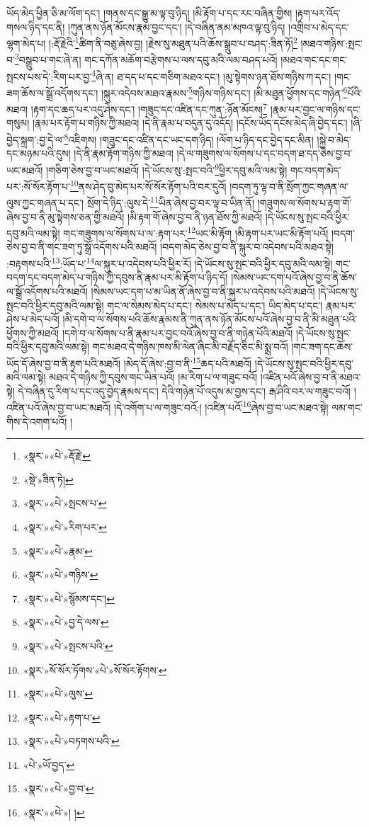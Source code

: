 ཡོད་མེད་ཕྱིན་ཅི་མ་ལོག་དང་། །གནས་དང་སྒྱུ་མ་ལྟ་བུ་ཉིད། །མི་རྟོག་པ་དང་རང་བཞིན་གྱིས། །རྟག་པར་འོད་གསལ་ཉིད་དང་ནི། །ཀུན་ནས་ཉོན་མོངས་རྣམ་བྱང་དང་། །དེ་བཞིན་ནམ་མཁའ་ལྟ་བུ་ཉིད། །འགྲིབ་པ་མེད་དང་ལྷག་མེད་པ། །:རྡོ་རྗེའི་\footnote{«སྣར་»«པེ་»རྡོ་རྗེ་}ཚིག་ནི་བཅུ་ཞེས་བྱ། །རྗེས་སུ་མཐུན་པའི་ཆོས་སྒྲུབ་པ་བཤད་:ཟིན་ཏོ།\footnote{«སྡེ་»ཟིན་ཏེ།} །མཐའ་གཉིས་:སྤང་བ་\footnote{«སྣར་»«པེ་»སྤངས་པ་}བསྒྲུབ་པ་གང་ཞེ་ན། གང་དཀོན་མཆོག་བརྩེགས་པ་ལས་དབུ་མའི་ལམ་བཤད་པའོ། །མཐའ་གང་དང་གང་སྤངས་པས་དེ་:རིག་པར་བྱ་\footnote{«སྣར་»«པེ་»རིག་པར་}ཞེ་ན། ཐ་དད་པ་དང་གཅིག་མཐའ་དང་། །མུ་སྟེགས་ཉན་ཐོས་གཉིས་ཀ་དང་། །གང་ཟག་ཆོས་ལ་སྒྲོ་འདོགས་དང་། །སྐུར་འདེབས་མཐའ་རྣམས་\footnote{«སྣར་»«པེ་»རྣམ་}གཉིས་གཉིས་དང་། །མི་མཐུན་ཕྱོགས་དང་གཉེན་\footnote{«སྣར་»«པེ་»གཉིས་}པོའི་མཐའ། །རྟག་དང་ཆད་པར་འདུ་ཤེས་དང་། །གཟུང་དང་འཛིན་དང་ཀུན་:ཉོན་མོངས།\footnote{«སྣར་»«པེ་»སྙོམས་དང་།} །རྣམ་པར་བྱང་ལ་གཉིས་དང་གསུམ། །རྣམ་པར་རྟོག་པ་གཉིས་ཀྱི་མཐའ། །དེ་ནི་རྣམ་པ་བདུན་དུ་འདོད། །དངོས་ཡོད་དངོས་མེད་ཞི་བྱེད་དང་། །ཞི་བྱེད་སྐྲག་:བྱ་དེ་ལ་\footnote{«སྣར་»«པེ་»བྱ་དེ་ལས་}འཇིགས། །གཟུང་དང་འཛིན་དང་ཡང་དག་ཉིད། །ལོག་པ་ཉིད་དང་བྱེད་དང་མིན། །སྐྱེ་བ་མེད་དང་མཉམ་པའི་དུས། །དེ་ནི་རྣམ་རྟོག་གཉིས་ཀྱི་མཐའ། །དེ་ལ་གཟུགས་ལ་སོགས་པ་དང་བདག་ཐ་དད་ཅེས་བྱ་བ་ཡང་མཐའོ། །གཅིག་ཅེས་བྱ་བ་ཡང་མཐའོ། །དེ་ཡོངས་སུ་:སྤང་བའི་\footnote{«སྣར་»«པེ་»སྤངས་པའི་}ཕྱིར་དབུ་མའི་ལམ་སྟེ། གང་བདག་མེད་པར་:སོ་སོར་རྟོག་པ་\footnote{«སྣར་»སོ་སོར་ཏོགས་«པེ་»སོ་སོར་རྟོགས་}ནས་ཤེད་བུ་མེད་པར་སོ་སོར་རྟོག་པའི་བར་དུའོ། །བདག་ཏུ་ལྟ་བ་ནི་སྲོག་ཀྱང་གཞན་ལ་ལུས་ཀྱང་གཞན་པ་དང་། སྲོག་དེ་ཉིད་:ལུས་དེ་\footnote{«སྣར་»«པེ་»ལུས་}ཡིན་ཞེས་བྱ་བར་ལྟ་བ་ཡིན་ནོ། །གཟུགས་ལ་སོགས་པ་རྟག་གོ་ཞེས་བྱ་བ་ནི་མུ་སྟེགས་ཅན་གྱི་མཐའོ། །མི་རྟག་གོ་ཞེས་བྱ་བ་ནི་ཉན་ཐོས་ཀྱི་མཐའོ། །དེ་ཡོངས་སུ་སྤང་བའི་ཕྱིར་དབུ་མའི་ལམ་སྟེ། གང་གཟུགས་ལ་སོགས་པ་ལ་:རྟག་པར་\footnote{«སྣར་»«པེ་»རྟག་པ་}ཡང་མི་རྟོག །མི་རྟག་པར་ཡང་མི་རྟོག་པའོ། །བདག་ཅེས་བྱ་བ་ནི་གང་ཟག་ཏུ་སྒྲོ་འདོགས་པའི་མཐའོ། །བདག་མེད་ཅེས་བྱ་བ་ནི་སྐུར་བ་འདེབས་པའི་མཐའ་སྟེ། :བརྟགས་པའི་\footnote{«སྣར་»«པེ་»བཏགས་པའི་}:ཡོད་པ་\footnote{«པེ་»ཡོ་བྱད་}ལ་སྐུར་པ་འདེབས་པའི་ཕྱིར་རོ། །དེ་ཡོངས་སུ་སྤང་བའི་ཕྱིར་དབུ་མའི་ལམ་སྟེ། གང་བདག་དང་བདག་མེད་པ་གཉིས་ཀྱི་དབུས་ནི་རྣམ་པར་མི་རྟོག་པ་ཉིད་དོ། །སེམས་ཡང་དག་པའོ་ཞེས་བྱ་བ་ནི་ཆོས་ལ་སྒྲོ་འདོགས་པའི་མཐའོ། །སེམས་ཡང་དག་པ་མ་ཡིན་ནོ་ཞེས་བྱ་བ་ནི་སྐུར་པ་འདེབས་པའི་མཐའོ། །དེ་ཡོངས་སུ་སྤང་བའི་ཕྱིར་དབུ་མའི་ལམ་སྟེ། གང་ལ་སེམས་མེད་པ་དང་། སེམས་པ་མེད་པ་དང་། ཡིད་མེད་པ་དང་། རྣམ་པར་ཤེས་པ་མེད་པའོ། །མི་དགེ་བ་ལ་སོགས་པའི་ཆོས་རྣམས་ནི་ཀུན་ནས་ཉོན་མོངས་པའོ་ཞེས་བྱ་བ་ནི་མི་མཐུན་པའི་ཕྱོགས་ཀྱི་མཐའོ། །དགེ་བ་ལ་སོགས་པ་ནི་རྣམ་པར་བྱང་བའོ་ཞེས་བྱ་བ་ནི་གཉེན་པོའི་མཐའོ། །དེ་ཡོངས་སུ་སྤང་བའི་ཕྱིར་དབུ་མའི་ལམ་སྟེ། གང་མཐའ་དེ་གཉིས་ཁས་མི་ལེན་ཞིང་མི་བརྗོད་ཅིང་མི་སྨྲ་བའོ། །གང་ཟག་དང་ཆོས་ཡོད་དོ་ཞེས་བྱ་བ་ནི་རྟག་པའི་མཐའོ། །མེད་དོ་ཞེས་:བྱ་བ་ནི་\footnote{«སྣར་»«པེ་»བྱ་བ་}ཆད་པའི་མཐའོ། །དེ་ཡོངས་སུ་སྤང་བའི་ཕྱིར་དབུ་མའི་ལམ་སྟེ། མཐའ་དེ་གཉིས་ཀྱི་དབུས་གང་ཡིན་པའོ། །མ་རིག་པ་ལ་གཟུང་བའོ། །འཛིན་པའོ་ཞེས་བྱ་བ་ནི་མཐའ་སྟེ། དེ་བཞིན་དུ་རིག་པ་དང་འདུ་བྱེད་རྣམས་དང་། དེའི་གཉེན་པོ་འདུས་མ་བྱས་དང་། རྒ་ཤིའི་བར་ལ་གཟུང་བའོ། །འཛིན་པའོ་ཞེས་བྱ་བ་ཡང་མཐའོ། །དེ་འགོག་པ་ལ་གཟུང་བའོ:། །འཛིན་པའོ་\footnote{«སྣར་»«པེ་»། །}ཞེས་བྱ་བ་ཡང་མཐའ་སྟེ། ལམ་གང་གིས་དེ་འགག་པའོ། །
